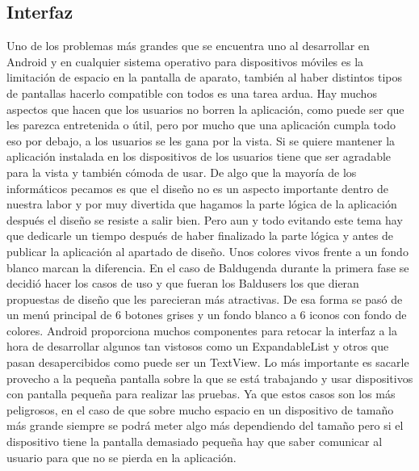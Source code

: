\subsection{Interfaz}
\label{subsecc:Interfaz}

Uno de los problemas más grandes que se encuentra uno al desarrollar en Android y en cualquier sistema operativo para dispositivos móviles es la limitación de espacio en la pantalla de aparato, también al haber distintos tipos de pantallas hacerlo compatible con todos es una tarea ardua.
Hay muchos aspectos que hacen que los usuarios no borren la aplicación, como puede ser que les parezca entretenida o útil, pero por mucho que una aplicación cumpla todo eso por debajo, a los usuarios se les gana por la vista. Si se quiere mantener la aplicación instalada en los dispositivos de los usuarios tiene que ser agradable para la vista y también cómoda de usar.
De algo que la mayoría de los informáticos pecamos es que el diseño no es un aspecto importante dentro de nuestra labor y por muy divertida que hagamos la parte lógica de la aplicación después el diseño se resiste a salir bien.
Pero aun y todo evitando este tema hay que dedicarle un tiempo después de haber finalizado la parte lógica y antes de publicar la aplicación al apartado de diseño.
Unos colores vivos frente a un fondo blanco marcan la diferencia.
En el caso de Baldugenda durante la primera fase se decidió hacer los casos de uso y que fueran los Baldusers los que dieran propuestas de diseño que les parecieran más atractivas.
De esa forma se pasó de un menú principal de 6 botones grises y un fondo blanco a 6 iconos con fondo de colores.
Android proporciona muchos componentes para retocar la interfaz a la hora de desarrollar algunos tan vistosos como un ExpandableList y otros que pasan desapercibidos como puede ser un TextView.
Lo más importante es sacarle provecho a la pequeña pantalla sobre la que se está trabajando y usar dispositivos con pantalla pequeña para realizar las pruebas. Ya que estos casos son los más peligrosos, en el caso de que sobre mucho espacio en un dispositivo de tamaño más grande siempre se podrá meter algo más dependiendo del tamaño pero si el dispositivo tiene la pantalla demasiado pequeña hay que saber comunicar al usuario para que no se pierda en la aplicación.

